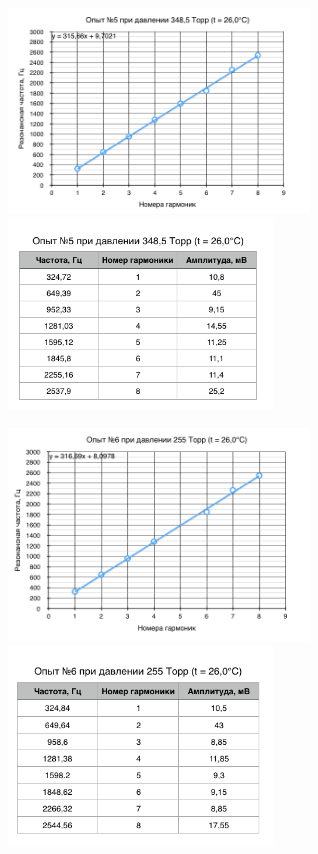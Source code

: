 \documentclass[a4paper,12pt]{article}
\begin{document}
\begin{figure}[h]
	\begin{multicols}{2}
		\hfill
		\includegraphics[width=80mm]{gr5.png}
		\hfill
		\label{gr5}
		\hfill
		\includegraphics[width=70mm]{t5.png}
		\hfill
		\label{t5}
	\end{multicols}
\end{figure}
\begin{figure}[h]
	\begin{multicols}{2}
		\hfill
		\includegraphics[width=80mm]{gr6.png}
		\hfill
		\label{gr6}
		\hfill
		\includegraphics[width=70mm]{t6.png}
		\hfill
		\label{t6}
	\end{multicols}
\end{figure}
\end{document}
